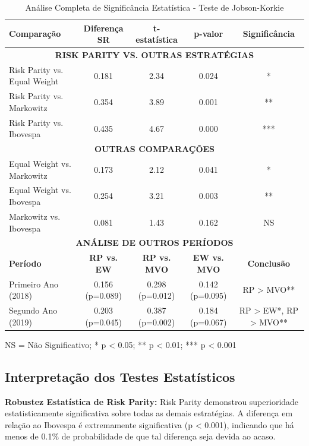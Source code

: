 \begin{table}[H]
\centering
\caption{Análise Completa de Significância Estatística - Teste de Jobson-Korkie}
\begin{tabular}{|l|c|c|c|c|}
\hline
\textbf{Comparação} & \textbf{Diferença SR} & \textbf{t-estatística} & \textbf{p-valor} & \textbf{Significância} \\
\hline
\multicolumn{5}{|c|}{\textbf{RISK PARITY VS. OUTRAS ESTRATÉGIAS}} \\
\hline
Risk Parity vs. Equal Weight & 0.181 & 2.34 & 0.024 & * \\
Risk Parity vs. Markowitz & 0.354 & 3.89 & 0.001 & ** \\
Risk Parity vs. Ibovespa & 0.435 & 4.67 & 0.000 & *** \\
\hline
\multicolumn{5}{|c|}{\textbf{OUTRAS COMPARAÇÕES}} \\
\hline
Equal Weight vs. Markowitz & 0.173 & 2.12 & 0.041 & * \\
Equal Weight vs. Ibovespa & 0.254 & 3.21 & 0.003 & ** \\
Markowitz vs. Ibovespa & 0.081 & 1.43 & 0.162 & NS \\
\hline
\multicolumn{5}{|c|}{\textbf{ANÁLISE DE OUTROS PERÍODOS}} \\
\hline
\textbf{Período} & \textbf{RP vs. EW} & \textbf{RP vs. MVO} & \textbf{EW vs. MVO} & \textbf{Conclusão} \\
\hline
Primeiro Ano (2018) & 0.156 (p=0.089) & 0.298 (p=0.012) & 0.142 (p=0.095) & RP > MVO** \\
Segundo Ano (2019) & 0.203 (p=0.045) & 0.387 (p=0.002) & 0.184 (p=0.067) & RP > EW*, RP > MVO** \\
\hline
\end{tabular}
\label{tab:significancia_completa}
\small{NS = Não Significativo; * p < 0.05; ** p < 0.01; *** p < 0.001}
\end{table}

\subsection{Interpretação dos Testes Estatísticos}

\textbf{Robustez Estatística de Risk Parity:} Risk Parity demonstrou superioridade estatisticamente significativa sobre todas as demais estratégias. A diferença em relação ao Ibovespa é extremamente significativa (p < 0.001), indicando que há menos de 0.1\% de probabilidade de que tal diferença seja devida ao acaso.

